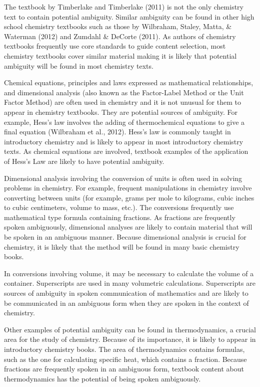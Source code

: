 \documentclass[11.5pt]{sig-alternate} %
\begin{document}
\begin{large}
The textbook by Timberlake and Timberlake (2011) is not the only chemistry text to contain potential ambiguity. Similar ambiguity can be found in other high school chemistry textbooks such as those by Wilbraham, Staley, Matta, \& Waterman (2012) and Zumdahl \& DeCorte (2011). As authors of chemistry textbooks frequently use core standards to guide content selection, most chemistry textbooks cover similar material making it is likely that potential ambiguity will be found in most chemistry texts.

Chemical equations, principles and laws expressed as mathematical relationships, and dimensional analysis (also known as the Factor-Label Method or the Unit Factor Method) are often used in chemistry and it is not unusual for them to appear in chemistry textbooks. They are potential sources of ambiguity. For example, Hess’s law involves the adding of thermochemical equations to give a final equation (Wilbraham et al., 2012). Hess’s law is commonly taught in introductory chemistry and is likely to appear in most introductory chemistry texts. As chemical equations are involved, textbook examples of the application of Hess’s Law are likely to have potential ambiguity. 

Dimensional analysis involving the conversion of units is often used in solving problems in chemistry. For example, frequent manipulations in chemistry involve converting between units (for example, grams per mole to kilograms, cubic inches to cubic centimeters, volume to mass, etc.). The conversions frequently use mathematical type formula containing fractions. As fractions are frequently spoken ambiguously, dimensional analyses are likely to contain material that will be spoken in an ambiguous manner. Because dimensional analysis is crucial for chemistry, it is likely that the method will be found in many basic chemistry books. 

In conversions involving volume, it may be necessary to calculate the volume of a container. Superscripts are used in many volumetric calculations. Superscripts are sources of ambiguity in spoken communication of mathematics and are likely to be communicated in an ambiguous form when they are spoken in the context of chemistry. 

Other examples of potential ambiguity can be found in thermodynamics, a crucial area for the study of chemistry. Because of its importance, it is likely to appear in introductory chemistry books. The area of thermodynamics contains formulas, such as the one for calculating specific heat, which contains a fraction. Because fractions are frequently spoken in an ambiguous form, textbook content about thermodynamics has the potential of being spoken ambiguously. 


\end{large}
\end{document}
